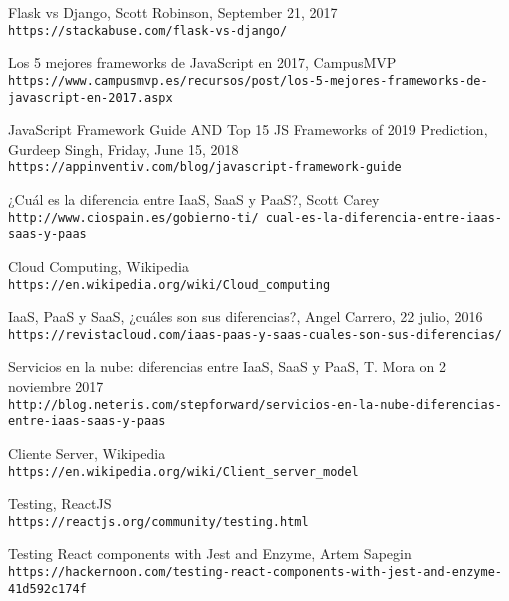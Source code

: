 \begin{thebibliography}{999}
Flask vs Django, Scott Robinson, September 21, 2017
\\\texttt{https://stackabuse.com/flask-vs-django/}

Los 5 mejores frameworks de JavaScript en 2017, CampusMVP
\\\texttt{https://www.campusmvp.es/recursos/post/los-5-mejores-frameworks-de-javascript-en-2017.aspx}

JavaScript Framework Guide AND Top 15 JS Frameworks of 2019 Prediction, Gurdeep Singh, Friday, June 15, 2018
\\\texttt{https://appinventiv.com/blog/javascript-framework-guide}

¿Cuál es la diferencia entre IaaS, SaaS y PaaS?, Scott Carey 
\\\texttt{http://www.ciospain.es/gobierno-ti/
cual-es-la-diferencia-entre-iaas-saas-y-paas}

Cloud Computing, Wikipedia
\\\texttt{https://en.wikipedia.org/wiki/Cloud\_computing}

IaaS, PaaS y SaaS, ¿cuáles son sus diferencias?, Angel Carrero, 22 julio, 2016 
\\\texttt{https://revistacloud.com/iaas-paas-y-saas-cuales-son-sus-diferencias/}

Servicios en la nube: diferencias entre IaaS, SaaS y PaaS,  T. Mora on 2 noviembre 2017 
\\\texttt{http://blog.neteris.com/stepforward/servicios-en-la-nube-diferencias-entre-iaas-saas-y-paas}

Cliente Server, Wikipedia
\\\texttt{https://en.wikipedia.org/wiki/Client\_server\_model}

Testing, ReactJS
\\\texttt{https://reactjs.org/community/testing.html}

Testing React components with Jest and Enzyme, Artem Sapegin
\\\texttt{https://hackernoon.com/testing-react-components-with-jest-and-enzyme-41d592c174f}




\end{thebibliography}

